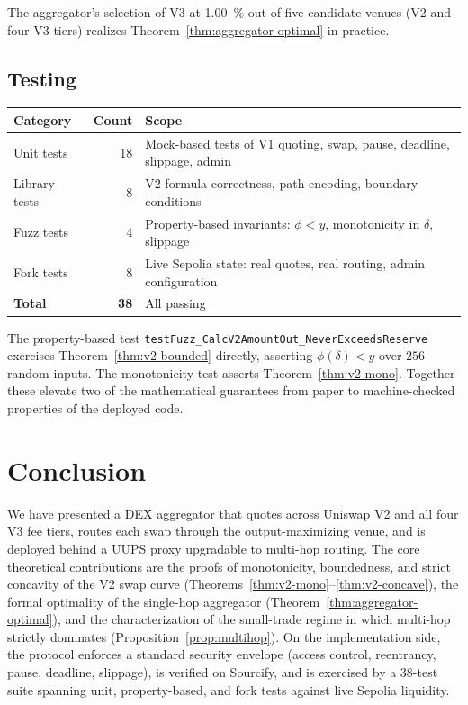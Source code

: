 \documentclass[11pt,a4paper]{article}
\theoremstyle{definition}
\begin{document}
The aggregator's selection of V3 at \SI{1.00}{\percent} out of five candidate
venues (V2 and four V3 tiers) realizes
Theorem~\ref{thm:aggregator-optimal} in practice.

\subsection{Testing}

\begin{center}
\small
\begin{tabular}{lrl}
\toprule
\textbf{Category} & \textbf{Count} & \textbf{Scope} \\
\midrule
Unit tests          & 18 & Mock-based tests of V1 quoting, swap, pause,
                           deadline, slippage, admin \\
Library tests       & 8  & V2 formula correctness, path encoding,
                           boundary conditions \\
Fuzz tests          & 4  & Property-based invariants:
                           $\phi < y$, monotonicity in $\delta$, slippage \\
Fork tests          & 8  & Live Sepolia state: real quotes, real routing,
                           admin configuration \\
\midrule
\textbf{Total}      & \textbf{38} & All passing \\
\bottomrule
\end{tabular}
\end{center}

The property-based test
\texttt{testFuzz\_CalcV2AmountOut\_NeverExceedsReserve} exercises
Theorem~\ref{thm:v2-bounded} directly, asserting $\phi(\delta) < y$ over
$256$ random inputs. The monotonicity test asserts
Theorem~\ref{thm:v2-mono}. Together these elevate two of the mathematical
guarantees from paper to machine-checked properties of the deployed code.

\section{Conclusion}

We have presented a DEX aggregator that quotes across Uniswap V2 and all four V3
fee tiers, routes each swap through the output-maximizing venue, and is deployed
behind a UUPS proxy upgradable to multi-hop routing. The core theoretical
contributions are the proofs of monotonicity, boundedness, and strict concavity
of the V2 swap curve (Theorems~\ref{thm:v2-mono}--\ref{thm:v2-concave}), the
formal optimality of the single-hop aggregator
(Theorem~\ref{thm:aggregator-optimal}), and the characterization of the
small-trade regime in which multi-hop strictly dominates
(Proposition~\ref{prop:multihop}). On the implementation side, the protocol
enforces a standard security envelope (access control, reentrancy, pause,
deadline, slippage), is verified on Sourcify, and is exercised by a 38-test
suite spanning unit, property-based, and fork tests against live Sepolia
liquidity.
\end{document}
